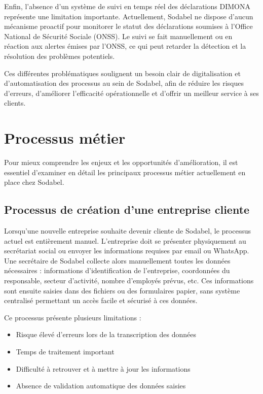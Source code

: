 \documentclass[12pt,a4paper]{report}
\begin{document}
Enfin, l'absence d'un système de suivi en temps réel des déclarations DIMONA représente une limitation importante. Actuellement, Sodabel ne dispose d'aucun mécanisme proactif pour monitorer le statut des déclarations soumises à l'Office National de Sécurité Sociale (ONSS). Le suivi se fait manuellement ou en réaction aux alertes émises par l'ONSS, ce qui peut retarder la détection et la résolution des problèmes potentiels.

Ces différentes problématiques soulignent un besoin clair de digitalisation et d'automatisation des processus au sein de Sodabel, afin de réduire les risques d'erreurs, d'améliorer l'efficacité opérationnelle et d'offrir un meilleur service à ses clients.

\section{Processus métier}

Pour mieux comprendre les enjeux et les opportunités d'amélioration, il est essentiel d'examiner en détail les principaux processus métier actuellement en place chez Sodabel.

\subsection{Processus de création d'une entreprise cliente}

Lorsqu'une nouvelle entreprise souhaite devenir cliente de Sodabel, le processus actuel est entièrement manuel. L'entreprise doit se présenter physiquement au secrétariat social ou envoyer les informations requises par email ou WhatsApp. Une secrétaire de Sodabel collecte alors manuellement toutes les données nécessaires : informations d'identification de l'entreprise, coordonnées du responsable, secteur d'activité, nombre d'employés prévus, etc. Ces informations sont ensuite saisies dans des fichiers ou des formulaires papier, sans système centralisé permettant un accès facile et sécurisé à ces données.

Ce processus présente plusieurs limitations :
\begin{itemize}
  \item Risque élevé d'erreurs lors de la transcription des données
  \item Temps de traitement important
  \item Difficulté à retrouver et à mettre à jour les informations
  \item Absence de validation automatique des données saisies
\end{itemize}
\end{document}
